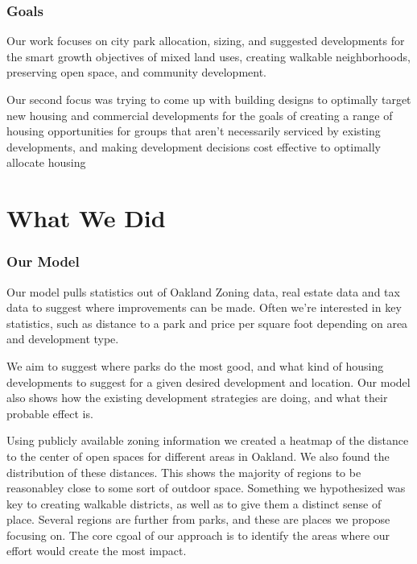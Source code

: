 \documentclass[]{report}
\begin{document}
	\section{Goals}
	Our work focuses on city park allocation, sizing, and suggested developments for the smart growth objectives of mixed land uses, creating walkable neighborhoods, preserving open space, and community development.
	
	Our second focus was trying to come up with building designs to optimally target new housing and commercial developments for the goals of creating a range of housing opportunities for groups that aren't necessarily serviced by existing developments, and making development decisions cost effective to optimally allocate housing
	
	
\part{What We Did}
	\section{Our Model}
	Our model pulls statistics out of Oakland Zoning data, real estate data and tax data to suggest where improvements can be made. Often we're interested in key statistics, such as distance to a park and price per square foot depending on area and development type.
	
	We aim to suggest where parks do the most good, and what kind of housing developments to suggest for a given desired development and location. Our model also shows how the existing development strategies are doing, and what their probable effect is.
	
	Using publicly available zoning information we created a heatmap of the distance to the center of open spaces for different areas in Oakland. We also found the distribution of these distances. This shows the majority of regions to be reasonabley close to some sort of outdoor space. Something we hypothesized was key to creating walkable districts, as well as to give them a distinct sense of place. Several regions are further from parks, and these are places we propose focusing on. The core cgoal of our approach is to identify the areas where our effort would create the most impact. 
	
\end{document}
